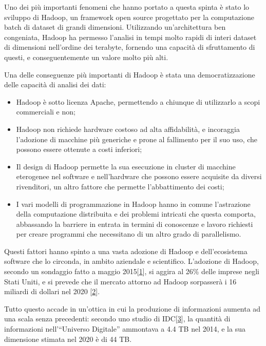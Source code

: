 \documentclass[italian,a4paper, twoside, 12pt]{report}
\providecommand{\tightlist}{%
  \setlength{\itemsep}{0pt}\setlength{\parskip}{0pt}}
\begin{document}
Uno dei più importanti fenomeni che hanno portato a questa spinta è
stato lo sviluppo di Hadoop, un framework open source progettato per la
computazione batch di dataset di grandi dimensioni. Utilizzando
un'architettura ben congeniata, Hadoop ha permesso l'analisi in tempi
molto rapidi di interi dataset di dimensioni nell'ordine dei terabyte,
fornendo una capacità di sfruttamento di questi, e conseguentemente un
valore molto più alti.

Una delle conseguenze più importanti di Hadoop è stata una
democratizzazione delle capacità di analisi dei dati:

\begin{itemize}
\tightlist
\item
  Hadoop è sotto licenza Apache, permettendo a chiunque di utilizzarlo a
  scopi commerciali e non;
\item
  Hadoop non richiede hardware costoso ad alta affidabilità, e
  incoraggia l'adozione di macchine più generiche e prone al fallimento
  per il suo uso, che possono essere ottenute a costi inferiori;
\item
  Il design di Hadoop permette la sua esecuzione in cluster di macchine
  eterogenee nel software e nell'hardware che possono essere acquisite
  da diversi rivenditori, un altro fattore che permette l'abbattimento
  dei costi;
\item
  I vari modelli di programmazione in Hadoop hanno in comune
  l'astrazione della computazione distribuita e dei problemi intricati
  che questa comporta, abbassando la barriere in entrata in termini di
  conoscenze e lavoro richiesti per creare programmi che necessitano di
  un altro grado di parallelismo.
\end{itemize}

Questi fattori hanno spinto a una vasta adozione di Hadoop e
dell'ecosistema software che lo circonda, in ambito aziendale e
scientifico. L'adozione di Hadoop, secondo un sondaggio fatto a maggio
2015{[}\protect\hyperlink{ref-hadoop-adoption-survey}{1}{]}, si aggira
al 26\% delle imprese negli Stati Uniti, e si prevede che il mercato
attorno ad Hadoop sorpasserà i 16 miliardi di dollari nel 2020
{[}\protect\hyperlink{ref-hadoop-market-analysis}{2}{]}.

Tutto questo accade in un'ottica in cui la produzione di informazioni
aumenta ad una scala senza precedenti: secondo uno studio di
IDC{[}\protect\hyperlink{ref-digital-univ}{3}{]}, la quantità di
informazioni nell'``Universo Digitale'' ammontava a 4.4 TB nel 2014, e
la sua dimensione stimata nel 2020 è di 44 TB.
\end{document}
